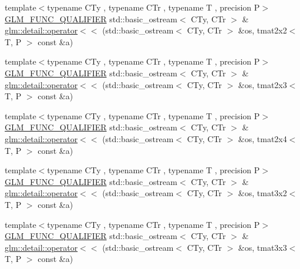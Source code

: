 \begin{DoxyCompactItemize}
\item 
{\footnotesize template$<$typename C\+Ty , typename C\+Tr , typename T , precision P$>$ }\\\hyperlink{setup_8hpp_a33fdea6f91c5f834105f7415e2a64407}{G\+L\+M\+\_\+\+F\+U\+N\+C\+\_\+\+Q\+U\+A\+L\+I\+F\+I\+ER} std\+::basic\+\_\+ostream$<$ C\+Ty, C\+Tr $>$ \& \hyperlink{namespaceglm_1_1detail_abb6c1e130aea32a985fa23ec2a141425}{glm\+::detail\+::operator$<$$<$} (std\+::basic\+\_\+ostream$<$ C\+Ty, C\+Tr $>$ \&os, tmat2x2$<$ T, P $>$ const \&a)
\item 
{\footnotesize template$<$typename C\+Ty , typename C\+Tr , typename T , precision P$>$ }\\\hyperlink{setup_8hpp_a33fdea6f91c5f834105f7415e2a64407}{G\+L\+M\+\_\+\+F\+U\+N\+C\+\_\+\+Q\+U\+A\+L\+I\+F\+I\+ER} std\+::basic\+\_\+ostream$<$ C\+Ty, C\+Tr $>$ \& \hyperlink{namespaceglm_1_1detail_a61bd5a416b26072f5e2fe28a97db95a9}{glm\+::detail\+::operator$<$$<$} (std\+::basic\+\_\+ostream$<$ C\+Ty, C\+Tr $>$ \&os, tmat2x3$<$ T, P $>$ const \&a)
\item 
{\footnotesize template$<$typename C\+Ty , typename C\+Tr , typename T , precision P$>$ }\\\hyperlink{setup_8hpp_a33fdea6f91c5f834105f7415e2a64407}{G\+L\+M\+\_\+\+F\+U\+N\+C\+\_\+\+Q\+U\+A\+L\+I\+F\+I\+ER} std\+::basic\+\_\+ostream$<$ C\+Ty, C\+Tr $>$ \& \hyperlink{namespaceglm_1_1detail_ab2a6dbe0abb4fca9178998164c393c2c}{glm\+::detail\+::operator$<$$<$} (std\+::basic\+\_\+ostream$<$ C\+Ty, C\+Tr $>$ \&os, tmat2x4$<$ T, P $>$ const \&a)
\item 
{\footnotesize template$<$typename C\+Ty , typename C\+Tr , typename T , precision P$>$ }\\\hyperlink{setup_8hpp_a33fdea6f91c5f834105f7415e2a64407}{G\+L\+M\+\_\+\+F\+U\+N\+C\+\_\+\+Q\+U\+A\+L\+I\+F\+I\+ER} std\+::basic\+\_\+ostream$<$ C\+Ty, C\+Tr $>$ \& \hyperlink{namespaceglm_1_1detail_a027e7063d30ba7f196f85a0b26273104}{glm\+::detail\+::operator$<$$<$} (std\+::basic\+\_\+ostream$<$ C\+Ty, C\+Tr $>$ \&os, tmat3x2$<$ T, P $>$ const \&a)
\item 
{\footnotesize template$<$typename C\+Ty , typename C\+Tr , typename T , precision P$>$ }\\\hyperlink{setup_8hpp_a33fdea6f91c5f834105f7415e2a64407}{G\+L\+M\+\_\+\+F\+U\+N\+C\+\_\+\+Q\+U\+A\+L\+I\+F\+I\+ER} std\+::basic\+\_\+ostream$<$ C\+Ty, C\+Tr $>$ \& \hyperlink{namespaceglm_1_1detail_a527e6f4797da8ec46052076f4abec4bb}{glm\+::detail\+::operator$<$$<$} (std\+::basic\+\_\+ostream$<$ C\+Ty, C\+Tr $>$ \&os, tmat3x3$<$ T, P $>$ const \&a)

\end{DoxyCompactItemize}
